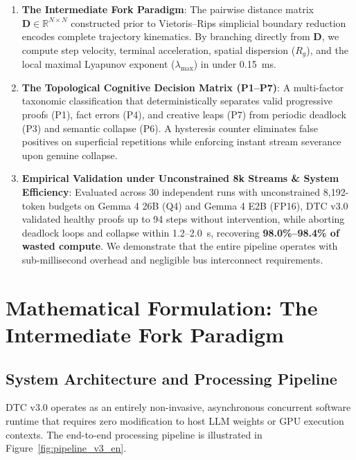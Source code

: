 \documentclass[11pt,a4paper]{article}
\begin{document}
\begin{enumerate}
    \item \textbf{The Intermediate Fork Paradigm}: The pairwise distance matrix $\mathbf{D} \in \mathbb{R}^{N \times N}$ constructed prior to Vietoris--Rips simplicial boundary reduction encodes complete trajectory kinematics. By branching directly from $\mathbf{D}$, we compute step velocity, terminal acceleration, spatial dispersion ($R_g$), and the local maximal Lyapunov exponent ($\lambda_{\max}$) in under 0.15~ms.
    \item \textbf{The Topological Cognitive Decision Matrix (P1--P7)}: A multi-factor taxonomic classification that deterministically separates valid progressive proofs (P1), fact errors (P4), and creative leaps (P7) from periodic deadlock (P3) and semantic collapse (P6). A hysteresis counter eliminates false positives on superficial repetitions while enforcing instant stream severance upon genuine collapse.
    \item \textbf{Empirical Validation under Unconstrained 8k Streams \& System Efficiency}: Evaluated across 30 independent runs with unconstrained 8,192-token budgets on Gemma 4 26B (Q4) and Gemma 4 E2B (FP16), DTC v3.0 validated healthy proofs up to 94 steps without intervention, while aborting deadlock loops and collapse within 1.2--2.0~s, recovering \textbf{98.0\%--98.4\% of wasted compute}. We demonstrate that the entire pipeline operates with sub-millisecond overhead and negligible bus interconnect requirements.
\end{enumerate}

\section{Mathematical Formulation: The Intermediate Fork Paradigm}

\subsection{System Architecture and Processing Pipeline}

DTC v3.0 operates as an entirely non-invasive, asynchronous concurrent software runtime that requires zero modification to host LLM weights or GPU execution contexts. The end-to-end processing pipeline is illustrated in Figure~\ref{fig:pipeline_v3_en}.
\end{document}
